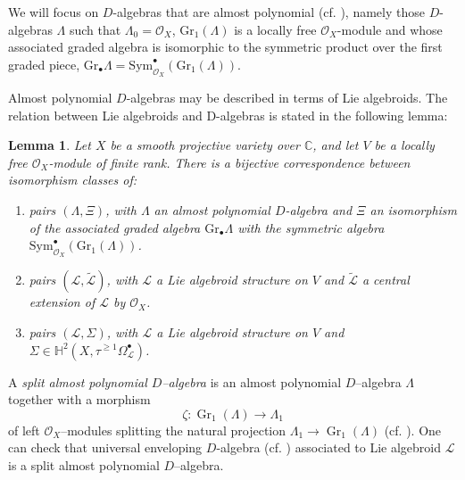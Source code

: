 \documentclass[12pt,reqno]{amsart}
\numberwithin{equation}{subsection}
\newtheorem{lem}[equation]{Lemma}
\theoremstyle{definition}
\theoremstyle{theorem}
\begin{document}
We will focus on $D$-algebras that are almost polynomial (cf. \cite[\S\,2, page 81]{CT.Simpson-1994}), namely those $D$-algebras $\Lambda$ such that $\Lambda_{0}=\mathcal{O}_{X}$, $\text{Gr}_{1}(\Lambda)$ is a locally free $\mathcal{O}_{X}$-module and whose associated graded algebra is isomorphic to the symmetric product over the first graded piece, $\text{Gr}_{\bullet}\Lambda = \text{Sym}_{\mathcal{O}_{X}}^{\bullet}(\text{Gr}_{1}(\Lambda))$.

Almost polynomial $D$-algebras may be described in terms of Lie algebroids. The relation between Lie algebroids and D-algebras is stated in the following lemma:

\begin{lem}\cite[Theorem 34]{P.Tortella-2011T}
Let $X$ be a smooth projective variety over $\mathbb{C}$, and let $V$ be a locally free $\mathcal{O}_{X}$-module of finite rank. There is a bijective correspondence between isomorphism classes of:
\begin{enumerate}
\item pairs $(\Lambda,\Xi)$, with $\Lambda$ an almost polynomial $D$-algebra and $\Xi$ an isomorphism of the associated graded algebra $\text{Gr}_{\bullet}\Lambda$ with the symmetric algebra $\text{Sym}_{\mathcal{O}_{X}}^{\bullet}(\text{Gr}_{1}(\Lambda))$.
\item pairs $(\mathcal{L},\tilde{\mathcal{L}})$, with $\mathcal{L}$ a Lie algebroid structure on $V$ and $\tilde{\mathcal{L}}$ a central extension of $\mathcal{L}$ by $\mathcal{O}_{X}$.
\item pairs $(\mathcal{L}, \Sigma)$, with $\mathcal{L}$ a Lie algebroid structure on $V$ and $\Sigma \in \mathbb{H}^{2}(X, \tau^{\geqslant 1}\Omega^{\bullet}_{\mathcal{L}})$.
\end{enumerate}
\end{lem}

A \emph{split almost polynomial $D$--algebra} is an almost polynomial $D$--algebra $\Lambda$ together with a morphism
\[
\zeta:\operatorname{Gr}_{1}(\Lambda)\longrightarrow \Lambda_{1}
\]
of left $\mathcal{O}_{X}$--modules splitting the natural projection $\Lambda_{1}\to \operatorname{Gr}_{1}(\Lambda)$ (cf. \cite[\S\,2, page 81]{CT.Simpson-1994}). One can check that universal enveloping $D$-algebra (cf. \cite[\S\,1]{Beilinson-Bernstein-1993}) associated to Lie algebroid $\mathcal{L}$ is a split almost polynomial $D$--algebra.
\end{document}
